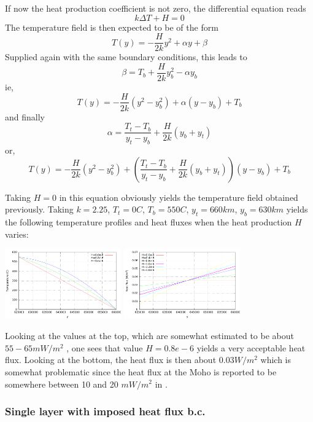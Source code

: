 If now the heat production coefficient is not zero, the differential equation
reads
\begin{equation}
 k \Delta T + H = 0 
\end{equation}
The temperature field is then expected to be of the form
\begin{equation}
T(y)= - \frac{H}{2k} y^2 + \alpha y + \beta 
\end{equation}
Supplied again with the same boundary conditions, this leads to
\[
\beta=T_b + \frac{H}{2k} y_b^2 - \alpha y_b
\]
ie,
\[
T(y) = -\frac{H}{2k} (y^2-y_b^2) + \alpha (y-y_b) + T_b
\]
and finally
\[
\alpha =  \frac{T_t-T_b}{y_t-y_b}  + \frac{H}{2k}(y_b+y_t)
\]
or,
\[
T(y) = -\frac{H}{2k} (y^2-y_b^2) + \left( \frac{T_t-T_b}{y_t-y_b}  + \frac{H}{2k}(y_b+y_t)   \right) (y-y_b) + T_b
\]

Taking $H=0$ in this equation obviously yields the temperature field obtained previously.
Taking $k=2.25$, $T_t=0C$, $T_b=550C$, $y_t=660km$, $y_b=630km$ yields the following
temperature profiles and heat fluxes when the heat production $H$ varies:
\begin{center}
\includegraphics[width=5cm]{images/initial_temperature/temperature1.pdf}
\includegraphics[width=5cm]{images/initial_temperature/heatflux1.pdf}
\end{center}
Looking at the values at the top, which are somewhat estimated to be
about $55-65mW/m^2$ \cite[table 8.6]{jama}, one sees that value $H=0.8e-6$ yields a very acceptable
heat flux.
Looking at the bottom, the heat flux is then about $0.03W/m^2$
which is somewhat problematic since the heat flux at the Moho
is reported to be somewhere between 10 and 20 $mW/m^2$ in \cite[table 7.1]{jama}.


\subsubsection{Single layer with imposed heat flux b.c.}

